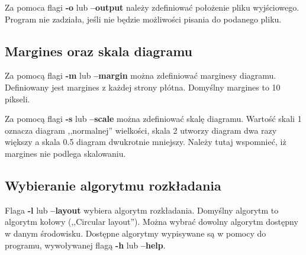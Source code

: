 Za pomoca flagi \textbf{-o} lub \textbf{--output} należy zdefiniować położenie pliku wyjściowego. Program nie zadziała, jeśli nie będzie możliwości pisania do podanego pliku.

\subsection{Margines oraz skala diagramu}
Za pomocą flagi \textbf{-m} lub \textbf{--margin} można zdefiniować marginesy diagramu. Definiowany jest margines z każdej strony płótna. Domyślny margines to 10 pikseli.

Za pomocą flagi \textbf{-s} lub \textbf{--scale} można zdefiniować skalę diagramu. Wartość skali 1 oznacza diagram ,,normalnej'' wielkości, skala 2 utworzy diagram dwa razy większy a skala 0.5 diagram dwukrotnie mniejszy. Należy tutaj wspomnieć, iż margines nie podlega skalowaniu.

\subsection{Wybieranie algorytmu rozkładania}
Flaga \textbf{-l} lub \textbf{--layout} wybiera algorytm rozkładania. Domyślny algorytm to algorytm kołowy (,,Circular layout''). Można wybrać dowolny algorytm dostępny w danym środowisku. Dostępne algorytmy wypisywane są w pomocy do programu, wywoływanej flagą \textbf{-h} lub \textbf{--help}.